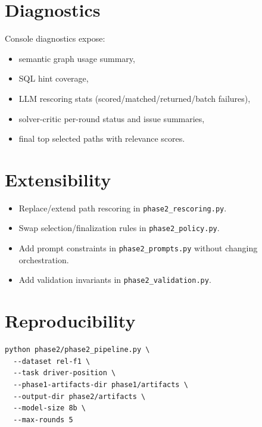 \documentclass[11pt]{article}
\begin{document}
\section{Diagnostics}
Console diagnostics expose:
\begin{itemize}[leftmargin=1.5em]
  \item semantic graph usage summary,
  \item SQL hint coverage,
  \item LLM rescoring stats (scored/matched/returned/batch failures),
  \item solver-critic per-round status and issue summaries,
  \item final top selected paths with relevance scores.
\end{itemize}

\section{Extensibility}
\begin{itemize}[leftmargin=1.5em]
  \item Replace/extend path rescoring in \texttt{phase2\_rescoring.py}.
  \item Swap selection/finalization rules in \texttt{phase2\_policy.py}.
  \item Add prompt constraints in \texttt{phase2\_prompts.py} without changing orchestration.
  \item Add validation invariants in \texttt{phase2\_validation.py}.
\end{itemize}

\section{Reproducibility}
\begin{verbatim}
python phase2/phase2_pipeline.py \
  --dataset rel-f1 \
  --task driver-position \
  --phase1-artifacts-dir phase1/artifacts \
  --output-dir phase2/artifacts \
  --model-size 8b \
  --max-rounds 5
\end{verbatim}
\end{document}
